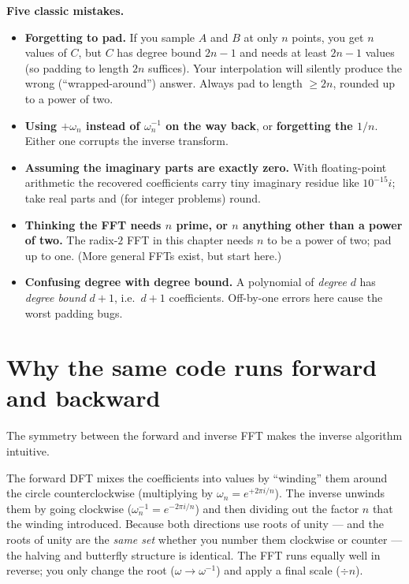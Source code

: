 \begin{trapbox}
\textbf{Five classic mistakes.}
\begin{itemize}
\item \textbf{Forgetting to pad.} If you sample $A$ and $B$ at only $n$ points, you
get $n$ values of $C$, but $C$ has degree bound $2n-1$ and needs at least $2n-1$
values (so padding to length $2n$ suffices). Your
interpolation will silently produce the wrong (``wrapped-around'') answer. Always
pad to length $\ge 2n$, rounded up to a power of two.
\item \textbf{Using $+\omega_n$ instead of $\omega_n^{-1}$ on the way back}, or
\textbf{forgetting the $1/n$}. Either one corrupts the inverse transform.
\item \textbf{Assuming the imaginary parts are exactly zero.} With floating-point
arithmetic the recovered coefficients carry tiny imaginary residue like
$10^{-15}i$; take real parts and (for integer problems) round.
\item \textbf{Thinking the FFT needs $n$ prime, or $n$ anything other than a power of
two.} The radix-$2$ FFT in this chapter needs $n$ to be a power of two; pad up to
one. (More general FFTs exist, but start here.)
\item \textbf{Confusing degree with degree bound.} A polynomial of \emph{degree}
$d$ has \emph{degree bound} $d+1$, i.e.\ $d+1$ coefficients. Off-by-one errors here
cause the worst padding bugs.
\end{itemize}
\end{trapbox}

\section{Why the same code runs forward and backward}

The symmetry between the forward and inverse FFT makes the inverse algorithm intuitive.

\begin{intuitionbox}
The forward DFT mixes the coefficients into values by ``winding'' them around the
circle counterclockwise (multiplying by $\omega_n = e^{+2\pi i/n}$). The inverse
unwinds them by going clockwise ($\omega_n^{-1} = e^{-2\pi i/n}$) and then dividing
out the factor $n$ that the winding introduced. Because both directions use roots of
unity --- and the roots of unity are the \emph{same set} whether you number them
clockwise or counter --- the halving and butterfly structure is identical. The FFT
runs equally well in reverse; you only change the root
($\omega \to \omega^{-1}$) and apply a final scale ($\div n$).
\end{intuitionbox}

